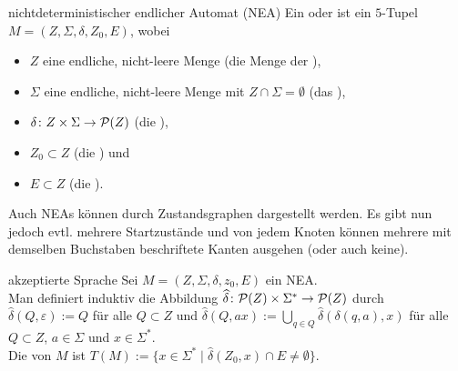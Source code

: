 \begin{Def}{nichtdeterministischer endlicher Automat (NEA)}
    Ein 
    oder  ist ein $5$-Tupel $M = (Z, \Sigma, \delta, Z_0, E)$,
    wobei
    \begin{itemize}
        \item
        $Z$ eine endliche, nicht-leere Menge
        (die Menge der ),

        \item
        $\Sigma$ eine endliche, nicht-leere Menge
        mit $Z \cap \Sigma = \emptyset$
        (das ),

        \item
        $\delta\colon Z \times \Sigma \rightarrow \P(Z)$
        (die ),

        \item
        $Z_0 \subset Z$ (die ) und

        \item
        $E \subset Z$ (die ).
    \end{itemize}
\end{Def}

\begin{Bem}
    Auch NEAs können durch Zustandsgraphen dargestellt werden.
    Es gibt nun jedoch evtl. mehrere Startzustände und von jedem Knoten
    können mehrere mit demselben Buchstaben beschriftete Kanten ausgehen
    (oder auch keine).
\end{Bem}

\begin{Def}{akzeptierte Sprache}
    Sei $M = (Z, \Sigma, \delta, z_0, E)$ ein NEA.\\
    Man definiert induktiv die Abbildung
    $\widehat{\delta}\colon \P(Z) \times \Sigma^\ast \rightarrow \P(Z)$ durch
    $\widehat{\delta}(Q, \varepsilon) := Q$ für alle $Q \subset Z$ und
    $\widehat{\delta}(Q, ax) := \bigcup_{q \in Q}
    \widehat{\delta}(\delta(q, a), x)$ für alle
    $Q \subset Z$, $a \in \Sigma$ und $x \in \Sigma^\ast$.\\
    Die von $M$  ist
    $T(M) := \{x \in \Sigma^\ast \;|\;
    \widehat{\delta}(Z_0, x) \cap E \not= \emptyset\}$.
\end{Def}

\linie

\pagebreak

